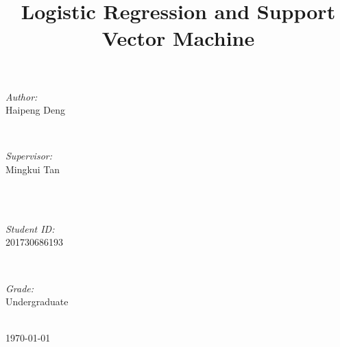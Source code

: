 \documentclass[journal, a4paper]{IEEEtran}
\begin{document}
\begin{titlepage}
\begin{minipage}{0.4\textwidth}
\begin{flushleft} \large
\emph{Author:}\\
Haipeng Deng %
\end{flushleft}
\end{minipage}
~
\begin{minipage}{0.4\textwidth}
\begin{flushright} \large
\emph{Supervisor:} \\
Mingkui Tan %
\end{flushright}
\end{minipage}\\[2cm]
~
\begin{minipage}{0.4\textwidth}
\begin{flushleft} \large
\emph{Student ID:}\\
201730686193
\end{flushleft}
\end{minipage}
~
\begin{minipage}{0.4\textwidth}
\begin{flushright} \large
\emph{Grade:} \\
Undergraduate
\end{flushright}
\end{minipage}\\[2cm]



{\large \today}\\[2cm] %



\vfill %

\end{titlepage}

	\title{Logistic Regression and Support Vector Machine}
	\maketitle
\end{document}

